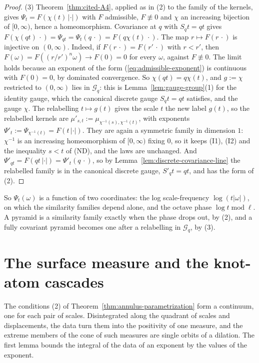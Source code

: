 \begin{proof}
(3) Theorem~\ref{thm:cited-A4}, applied as in (2) to the family of the kernels, gives
$\Psi_t = F(\chi(t)\,|\cdot|)$ with $F$ admissible, $F \not\equiv 0$ and
$\chi$ an increasing bijection of $[0,\infty)$, hence a homeomorphism. Covariance at $q$ with
$S_qt = qt$ gives $F(\chi(qt)\,\cdot) = \Psi_{qt} = \Psi_t(q\,\cdot) = F(q\chi(t)\,\cdot)$. The map
$r \mapsto F(r\,\cdot)$ is injective on $(0,\infty)$. Indeed, if $F(r\,\cdot) = F(r'\,\cdot)$ with
$r < r'$, then $F(\omega) = F((r/r')^n\omega) \to F(0) = 0$ for every $\omega$, against
$F \not\equiv 0$. The limit holds because an exponent of the form (\ref{eq:admissible-exponent}) is
continuous with $F(0) = 0$, by dominated convergence. So
$\chi(qt) = q\chi(t)$, and $g := \chi$ restricted to $(0,\infty)$ lies in $\mathcal{G}_q$: this is
Lemma~\ref{lem:gauge-group}(1) for the identity gauge, which the canonical discrete gauge
$S_qt = qt$ satisfies, and the gauge $\chi$. The relabelling $t \mapsto g(t)$ gives the scale $t$
the new label $g(t)$, so the relabelled kernels are $\mu'_{s,t} := \mu_{\chi^{-1}(s),\chi^{-1}(t)}$,
with exponents $\Psi'_t := \Psi_{\chi^{-1}(t)} = F(t\,|\cdot|)$. They are again a symmetric family
in dimension $1$: $\chi^{-1}$ is an increasing homeomorphism of $[0,\infty)$ fixing $0$, so it
keeps (I1), (I2) and the inequality $s < t$ of (ND), and the laws are unchanged. And
$\Psi'_{qt} = F(qt\,|\cdot|) = \Psi'_t(q\,\cdot)$, so by Lemma~\ref{lem:discrete-covariance-line}
the relabelled family is in the canonical discrete gauge, $S'_qt = qt$, and has the form of (2).
\end{proof}

So $\Psi_t(\omega)$ is a function of two coordinates: the log scale-frequency $\log(t|\omega|)$, on
which the similarity families depend alone, and the octave phase $\log t \operatorname{mod} \ell$. A pyramid
is a similarity family exactly when the phase drops out, by (2), and a fully covariant pyramid
becomes one after a relabelling in $\mathcal{G}_q$, by (3).

\section{The surface measure and the knot-atom cascades}
\label{sec:line-surface}

The conditions (2) of Theorem~\ref{thm:annulus-parametrization} form a continuum, one for each pair
of scales. Disintegrated along the quadrant of scales and displacements, the \Levy{} data turn them
into the positivity of one measure, and the extreme members of the cone of such measures are single
orbits of a dilation. The first lemma bounds the \Levy{} integral of the data of an exponent by the
values of the exponent.


